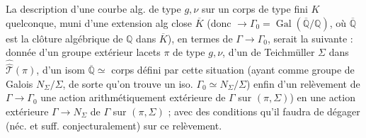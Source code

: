 La description d'une  courbe alg. de type $g,\nu$ sur un corps  de type fini  $K$ quelconque, muni d'une extension alg close $\overline K$ (donc  $\longrightarrow\Gamma_0=\operatorname{Gal}(\overline{\mathbb Q}/\mathbb Q)$, où $\overline{\mathbb Q}$ est la clôture algébrique de $\mathbb Q$ dans $\overline K$), en termes de $\Gamma\longrightarrow\Gamma_0$, serait la suivante : donnée d'un groupe extérieur  lacets $\pi$ de type $g,\nu$, d'un  de Teichmüller $\Sigma$ dans $\widehat{\widehat{\mathcal T}}(\pi)$, d'un isom $\overline{\mathbb Q}\simeq$ corps défini par cette situation (ayant comme groupe de Galois  $N_\Sigma/\Sigma$, de sorte qu'on trouve un iso. $\Gamma_0\simeq N_\Sigma/\Sigma$) enfin d'un relèvement de $\Gamma\longrightarrow\Gamma_0$   une action arithmétiquement extérieure de $\Gamma$ sur $(\pi,\Sigma)$) en une action extérieure $\Gamma\longrightarrow N_\Sigma$ de $\Gamma$ sur $(\pi,\Sigma)$ ; avec des conditions qu'il faudra 
de dégager (néc. et suff. conjecturalement) sur ce relèvement.

